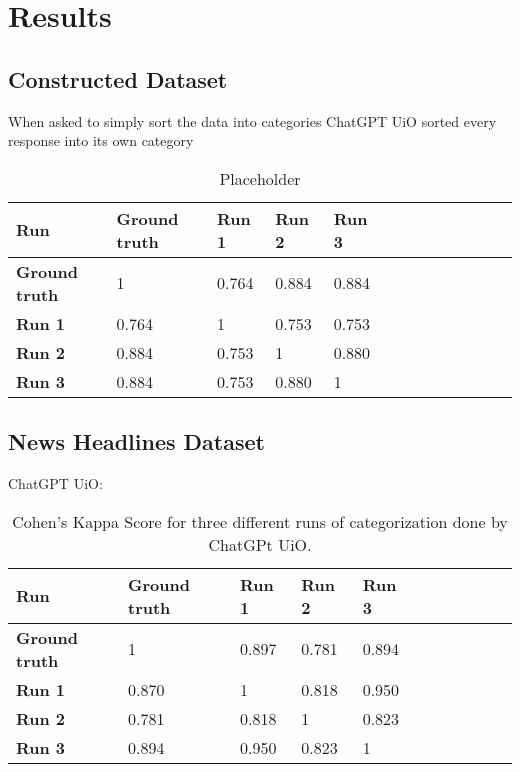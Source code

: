 \section{Results}
\subsection{Constructed Dataset}
When asked to simply sort the data into categories ChatGPT UiO sorted every response into its own category
\begin{table}[ht]
    \centering
        \begin{tabular}{@{}lllllllllllll@{}}\toprule        %
            \textbf{Run}  & \textbf{Ground truth} & \textbf{Run 1} & \textbf{Run 2} & \textbf{Run 3}\\ 
            \midrule
            \textbf{Ground truth} & 1  & 0.764 & 0.884 & 0.884\\
            \hdashline
            \textbf{Run 1} & 0.764 & 1 & 0.753 & 0.753\\
            \hdashline
            \textbf{Run 2} & 0.884 & 0.753& 1 & 0.880\\
            \hdashline
            \textbf{Run 3} & 0.884 & 0.753 & 0.880 & 1\\
            \bottomrule
        \end{tabular}
    \caption{Placeholder}
\end{table}

\subsection{News Headlines Dataset}
ChatGPT UiO:
\begin{table}[h]            %
    \centering
    \begin{tabular}{@{}lllllllllll@{}}\toprule
        \textbf{Run}  & \textbf{Ground truth} & \textbf{Run 1} & \textbf{Run 2} & \textbf{Run 3}\\ 
        \midrule
        \textbf{Ground truth} & \cellcolor[HTML]{FFFFFF} 1  & 0.897 & 0.781 & 0.894\\
        \hdashline
        \textbf{Run 1} & 0.870 & 1 & 0.818 & 0.950\\
        \hdashline
        \textbf{Run 2} & 0.781 & 0.818 & 1 & 0.823\\
        \hdashline
        \textbf{Run 3} & 0.894 & 0.950 & 0.823 & 1\\
        \bottomrule
    \end{tabular}
    \caption{Cohen's Kappa Score for three different runs of categorization done by ChatGPt UiO.}
\end{table}

